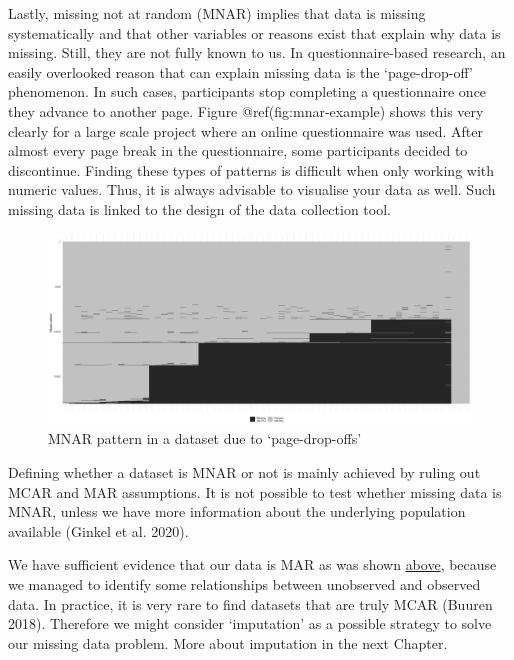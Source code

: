 \documentclass[
  letterpaper,
]{krantz}
\begin{document}
Lastly, missing not at random (MNAR) implies that data is missing
systematically and that other variables or reasons exist that explain
why data is missing. Still, they are not fully known to us. In
questionnaire-based research, an easily overlooked reason that can
explain missing data is the `page-drop-off' phenomenon. In such cases,
participants stop completing a questionnaire once they advance to
another page. Figure @ref(fig:mnar-example) shows this very clearly for
a large scale project where an online questionnaire was used. After
almost every page break in the questionnaire, some participants decided
to discontinue. Finding these types of patterns is difficult when only
working with numeric values. Thus, it is always advisable to visualise
your data as well. Such missing data is linked to the design of the data
collection tool.

\begin{figure}[H]

{\centering \includegraphics[width=6.4in,height=\textheight]{images/chapter_07_img/03_missing_data/00_mnar_example.png}

}

\caption{MNAR pattern in a dataset due to `page-drop-offs'}

\end{figure}%

Defining whether a dataset is MNAR or not is mainly achieved by ruling
out MCAR and MAR assumptions. It is not possible to test whether missing
data is MNAR, unless we have more information about the underlying
population available (Ginkel et al. 2020).

We have sufficient evidence that our data is MAR as was shown
\hyperref[missing-at-random-mar]{above}, because we managed to identify
some relationships between unobserved and observed data. In practice, it
is very rare to find datasets that are truly MCAR (Buuren 2018).
Therefore we might consider `imputation' as a possible strategy to solve
our missing data problem. More about imputation in the next Chapter.
\end{document}
